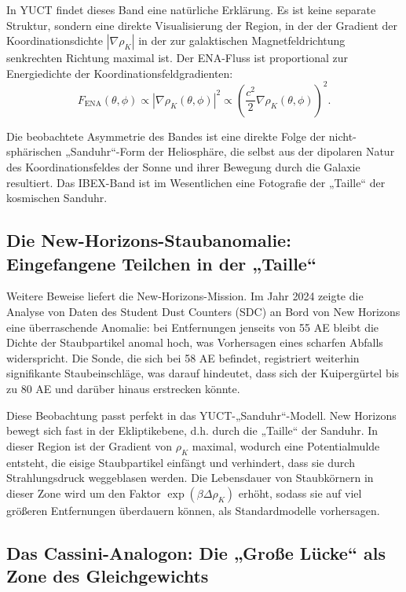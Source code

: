 \documentclass[12pt,a4paper]{article}
\theoremstyle{remark}
\begin{document}
	In YUCT findet dieses Band eine natürliche Erklärung. Es ist keine separate Struktur, sondern eine direkte Visualisierung der Region, in der der Gradient der Koordinationsdichte $|\nabla \rho_K|$ in der zur galaktischen Magnetfeldrichtung senkrechten Richtung maximal ist. Der ENA-Fluss ist proportional zur Energiedichte der Koordinationsfeldgradienten:
	\begin{equation}
		F_{\text{ENA}}(\theta, \phi) \propto |\nabla \rho_K(\theta, \phi)|^2 \propto \left( \frac{c^2}{2} \nabla \rho_K(\theta, \phi) \right)^2.
		\label{eq:coord:ibex_flux}
	\end{equation}
	
	Die beobachtete Asymmetrie des Bandes ist eine direkte Folge der nicht-sphärischen „Sanduhr“-Form der Heliosphäre, die selbst aus der dipolaren Natur des Koordinationsfeldes der Sonne und ihrer Bewegung durch die Galaxie resultiert. Das IBEX-Band ist im Wesentlichen eine Fotografie der „Taille“ der kosmischen Sanduhr.
	
	\subsection{Die New-Horizons-Staubanomalie: Eingefangene Teilchen in der „Taille“}
	\label{subsec:coord:newhorizons}
	
	Weitere Beweise liefert die New-Horizons-Mission. Im Jahr 2024 zeigte die Analyse von Daten des Student Dust Counters (SDC) an Bord von New Horizons eine überraschende Anomalie: bei Entfernungen jenseits von 55 AE bleibt die Dichte der Staubpartikel anomal hoch, was Vorhersagen eines scharfen Abfalls widerspricht. Die Sonde, die sich bei 58 AE befindet, registriert weiterhin signifikante Staubeinschläge, was darauf hindeutet, dass sich der Kuipergürtel bis zu 80 AE und darüber hinaus erstrecken könnte.
	
	Diese Beobachtung passt perfekt in das YUCT-„Sanduhr“-Modell. New Horizons bewegt sich fast in der Ekliptikebene, d.h. durch die „Taille“ der Sanduhr. In dieser Region ist der Gradient von $\rho_K$ maximal, wodurch eine Potentialmulde entsteht, die eisige Staubpartikel einfängt und verhindert, dass sie durch Strahlungsdruck weggeblasen werden. Die Lebensdauer von Staubkörnern in dieser Zone wird um den Faktor $\exp(\beta \Delta \rho_K)$ erhöht, sodass sie auf viel größeren Entfernungen überdauern können, als Standardmodelle vorhersagen.
	
	\subsection{Das Cassini-Analogon: Die „Große Lücke“ als Zone des Gleichgewichts}
	\label{subsec:coord:cassini}
	
\end{document}
